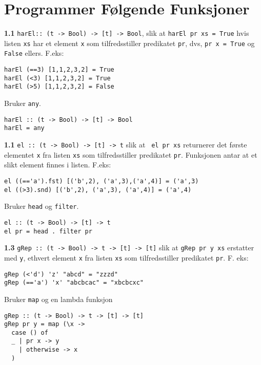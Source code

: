 \documentclass{article}
\begin{document}
    \section{Programmer Følgende Funksjoner}

    \textbf{1.1} \texttt{harEl:: (t -> Bool) -> [t] -> Bool}, slik at \texttt{harEl pr xs = True} hvis listen \texttt{xs} har et element \texttt{x} som tilfredsstiller predikatet \texttt{pr}, dvs, \texttt{pr x = True} og \texttt{False} ellers. F.eks:
    \begin{lstlisting}
harEl (==3) [1,1,2,3,2] = True
harEl (<3) [1,1,2,3,2] = True
harEl (>5) [1,1,2,3,2] = False
    \end{lstlisting}

    \begin{ans}
        Bruker \texttt{any}.
        \begin{lstlisting}
harEl :: (t -> Bool) -> [t] -> Bool
harEl = any
        \end{lstlisting}
    \end{ans}

    \textbf{1.1} \texttt{el :: (t -> Bool) -> [t] -> t} slik at \texttt{ el pr xs} returnerer det første elementet \texttt{x} fra listen \texttt{xs} som tilfredsstiller predikatet \texttt{pr}. Funksjonen antar at et slikt element finnes i listen. F.eks:

    \begin{lstlisting}
el ((=='a').fst) [('b',2), ('a',3),('a',4)] = ('a',3)
el ((>3).snd) [('b',2), ('a',3), ('a',4)] = ('a',4)
    \end{lstlisting}

    \begin{ans}
        Bruker \texttt{head} og \texttt{filter}.
        \begin{lstlisting}
el :: (t -> Bool) -> [t] -> t
el pr = head . filter pr
        \end{lstlisting}
    \end{ans}

    \textbf{1.3} \texttt{gRep :: (t -> Bool) -> t -> [t] -> [t]} slik at \texttt{gRep pr y xs} erstatter med \texttt{y}, ethvert element \texttt{x} fra listen \texttt{xs} som tilfredsstiller predikatet \texttt{pr}. F. eks:

    \begin{lstlisting}
gRep (<'d') 'z' "abcd" = "zzzd" 
gRep (=='a') 'x' "abcbcac" = "xbcbcxc" 
    \end{lstlisting}

    \begin{ans}
        Bruker \texttt{map} og en lambda funksjon
        
        \begin{lstlisting}
gRep :: (t -> Bool) -> t -> [t] -> [t]
gRep pr y = map (\x ->
  case () of
  _ | pr x -> y
    | otherwise -> x
  )
        \end{lstlisting}
    \end{ans}
\end{document}
